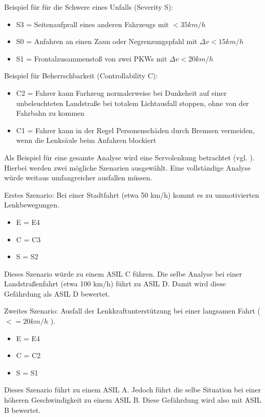 \documentclass[a4paper,DIV=calc,ngerman]{scrartcl}
\begin{document}
Beispiel für für die Schwere eines Unfalls (Severity S):
\begin{itemize}
    \item S3 = Seitenaufprall eines anderen Fahrzeugs mit $ < 35 km/h $
    \item S0 = Anfahren an einen Zaun oder Negrenzungspfahl mit $ \Delta v < 15 km/h $
    \item S1 = Frontalzusammenstoß von zwei PKWs mit $ \Delta v < 20 km/h $
\end{itemize}

Beispiel für Beherrschbarkeit (Controllability C):
\begin{itemize}
    \item C2 = Fahrer kann Farhzeug normalerweise bei Dunkeheit auf einer unbeleuchteten Landstraße bei totalem Lichtausfall stoppen, ohne von der Fahrbahn zu kommen
    \item C1 = Fahrer kann in der Regel Personenschäden durch Bremsen vermeiden, wenn die Lenksäule beim Anfahren blockiert
\end{itemize}

Als Beispiel für eine gesamte Analyse wird eine Servolenkung betrachtet (vgl. \cite[S. 217]{1}). Hierbei werden zwei mögliche Szenarien ausgewählt. Eine vollständige Analyse würde weitaus umfangreicher ausfallen müssen.

Erstes Szenario: Bei einer Stadtfahrt (etwa 50 km/h) kommt es zu unmotivierten Lenkbewegungen.
\begin{itemize}
    \item E = E4
    \item C = C3
    \item S = S2
\end{itemize}

Dieses Szenario würde zu einem ASIL C führen. Die selbe Analyse bei einer Landstraßenfahrt (etwa 100 km/h) führt zu ASIL D. Damit wird diese Gefährdung als ASIL D bewertet.

Zweites Szenario: Ausfall der Lenkkraftunterstützung bei einer langsamen Fahrt ( $ <= 20 km/h $ ).

\begin{itemize}
    \item E = E4
    \item C = C2
    \item S = S1
\end{itemize}

Dieses Szenario führt zu einem ASIL A. Jedoch führt die selbe Situation bei einer höheren Geschwindigkeit zu einem ASIL B. Diese Gefährdung wird also mit ASIL B bewertet.
\end{document}
